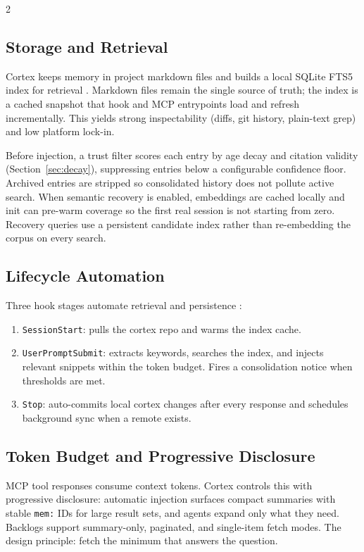 \documentclass[10pt]{article}
\begin{document}
\vspace{0.4em}
\begin{multicols}{2}

\subsection{Storage and Retrieval}
Cortex keeps memory in project markdown files and builds a local SQLite FTS5 index for retrieval \cite{cortex-readme,cortex-shared,cortex-cli}. Markdown files remain the single source of truth; the index is a cached snapshot that hook and MCP entrypoints load and refresh incrementally. This yields strong inspectability (diffs, git history, plain-text grep) and low platform lock-in.

Before injection, a trust filter scores each entry by age decay and citation validity (Section~\ref{sec:decay}), suppressing entries below a configurable confidence floor. Archived entries are stripped so consolidated history does not pollute active search. When semantic recovery is enabled, embeddings are cached locally and init can pre-warm coverage so the first real session is not starting from zero. Recovery queries use a persistent candidate index rather than re-embedding the corpus on every search.

\subsection{Lifecycle Automation}
Three hook stages automate retrieval and persistence \cite{cortex-cli,cortex-hooks}:
\begin{enumerate}
  \item \texttt{SessionStart}: pulls the cortex repo and warms the index cache.
  \item \texttt{UserPromptSubmit}: extracts keywords, searches the index, and injects relevant snippets within the token budget. Fires a consolidation notice when thresholds are met.
  \item \texttt{Stop}: auto-commits local cortex changes after every response and schedules background sync when a remote exists.
\end{enumerate}

\subsection{Token Budget and Progressive Disclosure}
\label{sec:context-opt}
MCP tool responses consume context tokens. Cortex controls this with progressive disclosure: automatic injection surfaces compact summaries with stable \texttt{mem:} IDs for large result sets, and agents expand only what they need. Backlogs support summary-only, paginated, and single-item fetch modes. The design principle: fetch the minimum that answers the question.


\end{multicols}
\end{document}
